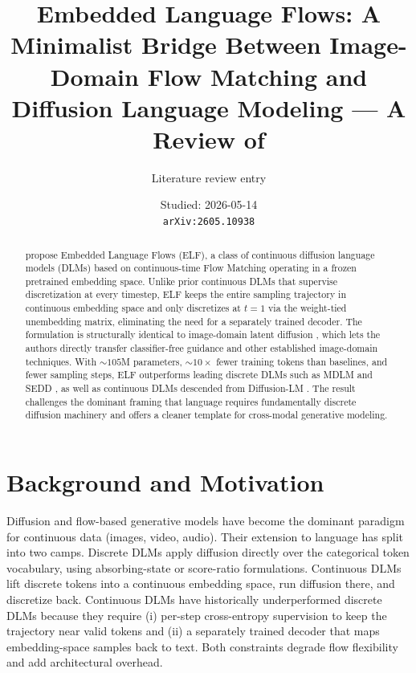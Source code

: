\documentclass[11pt]{article}
\title{Embedded Language Flows: A Minimalist Bridge Between Image-Domain Flow Matching and Diffusion Language Modeling --- A Review of \citet{hu2026elf}}
\author{Literature review entry}
\date{Studied: 2026-05-14 \\ \texttt{arXiv:2605.10938}}
\begin{document}
\maketitle

\begin{abstract}
\citet{hu2026elf} propose Embedded Language Flows (ELF), a class of continuous diffusion language models (DLMs) based on continuous-time Flow Matching \citep{lipman2022fm, liu2022rectified} operating in a frozen pretrained embedding space. Unlike prior continuous DLMs that supervise discretization at every timestep, ELF keeps the entire sampling trajectory in continuous embedding space and only discretizes at $t = 1$ via the weight-tied unembedding matrix, eliminating the need for a separately trained decoder. The formulation is structurally identical to image-domain latent diffusion \citep{rombach2022ldm}, which lets the authors directly transfer classifier-free guidance \citep{ho2022cfg} and other established image-domain techniques. With $\sim 105$M parameters, $\sim 10\times$ fewer training tokens than baselines, and fewer sampling steps, ELF outperforms leading discrete DLMs such as MDLM \citep{sahoo2024mdlm} and SEDD \citep{lou2024sedd}, as well as continuous DLMs descended from Diffusion-LM \citep{li2022diffusionlm}. The result challenges the dominant framing that language requires fundamentally discrete diffusion machinery and offers a cleaner template for cross-modal generative modeling.
\end{abstract}

\section*{Background and Motivation}

Diffusion and flow-based generative models \citep{ho2020ddpm, lipman2022fm, liu2022rectified, albergo2025interpolants} have become the dominant paradigm for continuous data (images, video, audio). Their extension to language has split into two camps. Discrete DLMs \citep{austin2021d3pm, sahoo2024mdlm, lou2024sedd} apply diffusion directly over the categorical token vocabulary, using absorbing-state or score-ratio formulations. Continuous DLMs \citep{li2022diffusionlm} lift discrete tokens into a continuous embedding space, run diffusion there, and discretize back. Continuous DLMs have historically underperformed discrete DLMs because they require (i) per-step cross-entropy supervision to keep the trajectory near valid tokens and (ii) a separately trained decoder that maps embedding-space samples back to text. Both constraints degrade flow flexibility and add architectural overhead.
\end{document}
